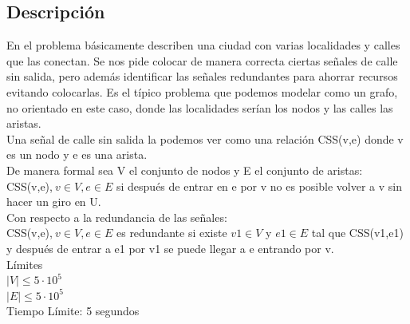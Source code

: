 \documentclass{report}
\begin{document}
\subsection{Descripci\'on}
En el problema b\'asicamente describen una ciudad con varias localidades y calles que las conectan. Se nos pide colocar de manera correcta ciertas se\~nales de calle sin salida, pero adem\'as identificar las se\~nales redundantes para ahorrar recursos evitando colocarlas.
Es el t\'ipico problema que podemos modelar como un grafo, no orientado en este caso, donde las localidades ser\'ian los nodos y las calles las aristas.\\
Una se\~nal de calle sin salida la podemos ver como una relaci\'on CSS(v,e) donde v es un nodo y e es una arista.\\
De manera formal sea V el conjunto de nodos y E el conjunto de aristas:\\
 CSS(v,e),$\ v \in V,e \in E$ si despu\'es de entrar en e por v no es posible volver a v sin hacer un giro en U.\\
Con respecto a la redundancia de las se\~nales:\\
CSS(v,e),$\ v \in V,e \in E$ es redundante si existe $v1 \in V$ y $e1 \in E$ tal que CSS(v1,e1) y despu\'es de entrar a e1 por v1 se puede llegar a e entrando por v.\\

L\'imites\\
$|V| \leq 5\cdot10^5$\\
$|E| \leq 5\cdot10^5$\\
Tiempo L\'imite: 5 segundos\\
\end{document}
